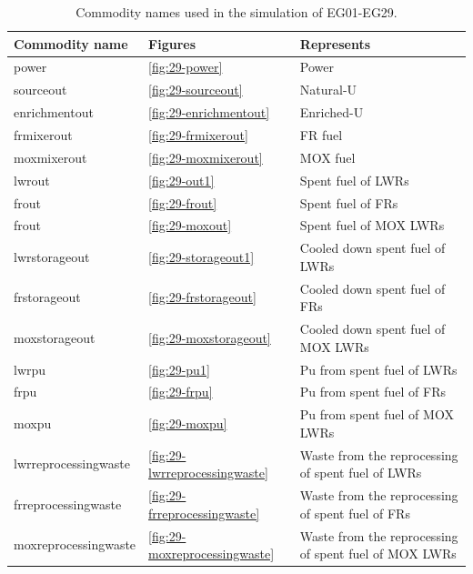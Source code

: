 \documentclass[11pt]{article}
\begin{document}
\begin{table}[H]
	\centering
	\caption{Commodity names used in the simulation of EG01-EG29.}
	\label{tab:29-commodities}
	\begin{tabularx}{\textwidth}{lLL}
		\hline
		Commodity name  & Figures & Represents \\ \hline
		power           & \ref{fig:29-power} & Power \\
		sourceout       & \ref{fig:29-sourceout} & Natural-U \\
		enrichmentout   & \ref{fig:29-enrichmentout} & Enriched-U \\
		frmixerout      &  \ref{fig:29-frmixerout} & FR fuel \\
    	moxmixerout     &  \ref{fig:29-moxmixerout} & MOX fuel \\
		lwrout          & \ref{fig:29-out1} & Spent fuel of LWRs \\
		frout           & \ref{fig:29-frout} & Spent fuel of FRs \\
		frout           & \ref{fig:29-moxout} & Spent fuel of MOX LWRs \\
		lwrstorageout   & \ref{fig:29-storageout1} & Cooled down spent fuel of LWRs \\
		frstorageout    & \ref{fig:29-frstorageout} & Cooled down spent fuel of FRs \\	
		moxstorageout    & \ref{fig:29-moxstorageout} & Cooled down spent fuel of MOX LWRs \\	
		lwrpu   & \ref{fig:29-pu1} & Pu from spent fuel of LWRs \\
		frpu    & \ref{fig:29-frpu} & Pu from spent fuel of FRs \\
		moxpu    & \ref{fig:29-moxpu} & Pu from spent fuel of MOX LWRs \\
		lwrreprocessingwaste & \ref{fig:29-lwrreprocessingwaste} & Waste from the reprocessing of spent fuel of LWRs \\
		frreprocessingwaste & \ref{fig:29-frreprocessingwaste} & Waste from the reprocessing of spent fuel of FRs \\
		moxreprocessingwaste & \ref{fig:29-moxreprocessingwaste} & Waste from the reprocessing of spent fuel of MOX LWRs \\ \hline
			
	\end{tabularx}
\end{table}
\end{document}
